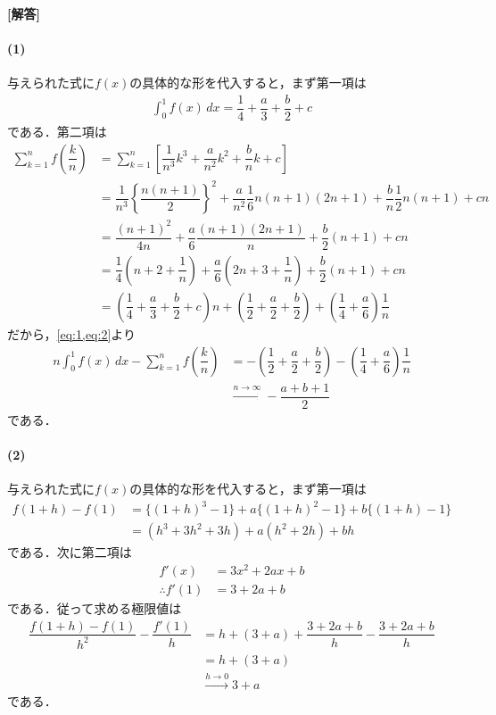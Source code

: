 \documentclass[../../main.tex]{subfiles}
\begin{document}
\begin{oframed}
  
\end{oframed}

{\bf [解答]}
\paragraph{(1)}
与えられた式に$f(x)$の具体的な形を代入すると，まず第一項は
\begin{align}
  \int_0^1 f(x) \, dx = \dfrac{1}{4} + \dfrac{a}{3} + \dfrac{b}{2} + c \label{eq:1}
\end{align}
である．第二項は
\begin{align}
  \sum_{k=1}^n f\left(\dfrac{k}{n}\right)
  &= \sum_{k=1}^n \left[ \dfrac{1}{n^3} k^3 + \dfrac{a}{n^2} k^2 + \dfrac{b}{n} k + c \right] \\
  &= \dfrac{1}{n^3} \left\{ \dfrac{n(n+1)}{2} \right\}^2 + \dfrac{a}{n^2} \dfrac{1}{6} n(n+1)(2n+1) + \dfrac{b}{n} \dfrac{1}{2} n(n+1) + cn \\
  &= \dfrac{(n+1)^2}{4n} + \dfrac{a}{6} \dfrac{(n+1)(2n+1)}{n} + \dfrac{b}{2}(n+1) + cn \\
  &= \dfrac{1}{4}\left(n + 2 + \dfrac{1}{n}\right) + \dfrac{a}{6}\left(2n + 3 + \dfrac{1}{n}\right) + \dfrac{b}{2}(n+1) + cn \\
  &= \left(\dfrac{1}{4} + \dfrac{a}{3} + \dfrac{b}{2} + c\right) n + \left(\dfrac{1}{2} + \dfrac{a}{2} + \dfrac{b}{2}\right) + \left(\dfrac{1}{4} + \dfrac{a}{6}\right) \dfrac{1}{n} \label{eq:2}
\end{align}
だから，\cref{eq:1,eq:2}より
\begin{align}
  n \int_0^1 f(x) \, dx - \sum_{k=1}^n f\left(\dfrac{k}{n}\right)
  &= -\left(\dfrac{1}{2} + \dfrac{a}{2} + \dfrac{b}{2}\right) - \left(\dfrac{1}{4} + \dfrac{a}{6}\right) \dfrac{1}{n}\\
  & \xrightarrow{n \to \infty} -\dfrac{a+b+1}{2}
\end{align}
である．

\paragraph{(2)}
与えられた式に$f(x)$の具体的な形を代入すると，まず第一項は
\begin{align}
  f(1+h) - f(1)
  &= \{(1+h)^3 - 1\} + a\{(1+h)^2 - 1\} + b\{(1+h) - 1\} \\
  &= (h^3 + 3h^2 + 3h) + a(h^2 + 2h) + bh \label{eq:3}
\end{align}
である．次に第二項は
\begin{align}
  f'(x) &= 3x^2 + 2ax + b \\
  \therefore
  f'(1) &= 3+2a+b \label{eq:4}
\end{align}
である．従って求める極限値は
\begin{align}
  \dfrac{f(1+h) - f(1)}{h^2} - \dfrac{f'(1)}{h}
  &= h + (3+a) + \dfrac{3+2a+b}{h} - \dfrac{3+2a+b}{h} \\
  &= h + (3+a) \\
  &\xrightarrow{h \to 0} 3+a
\end{align}
である．
\end{document}
